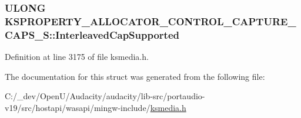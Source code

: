 \subsubsection[{\texorpdfstring{Interleaved\+Cap\+Supported}{InterleavedCapSupported}}]{\setlength{\rightskip}{0pt plus 5cm}U\+L\+O\+NG K\+S\+P\+R\+O\+P\+E\+R\+T\+Y\+\_\+\+A\+L\+L\+O\+C\+A\+T\+O\+R\+\_\+\+C\+O\+N\+T\+R\+O\+L\+\_\+\+C\+A\+P\+T\+U\+R\+E\+\_\+\+C\+A\+P\+S\+\_\+\+S\+::\+Interleaved\+Cap\+Supported}\hypertarget{struct_k_s_p_r_o_p_e_r_t_y___a_l_l_o_c_a_t_o_r___c_o_n_t_r_o_l___c_a_p_t_u_r_e___c_a_p_s___s_a98d053a0692025ea823b0d4ad94c84a3}{}\label{struct_k_s_p_r_o_p_e_r_t_y___a_l_l_o_c_a_t_o_r___c_o_n_t_r_o_l___c_a_p_t_u_r_e___c_a_p_s___s_a98d053a0692025ea823b0d4ad94c84a3}


Definition at line 3175 of file ksmedia.\+h.



The documentation for this struct was generated from the following file\+:\begin{DoxyCompactItemize}
\item 
C\+:/\+\_\+dev/\+Open\+U/\+Audacity/audacity/lib-\/src/portaudio-\/v19/src/hostapi/wasapi/mingw-\/include/\hyperlink{ksmedia_8h}{ksmedia.\+h}\end{DoxyCompactItemize}
